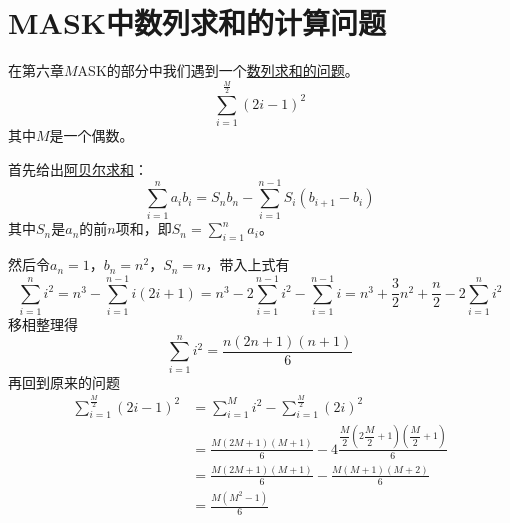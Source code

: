 \section{MASK中数列求和的计算问题}
    在第六章$M$ASK的部分中我们遇到一个\hyperref[question:sum_of_serises]{数列求和的问题}。
    \begin{equation*}
        \sum_{i=1}^{\frac{M}{2}}(2i-1)^2
    \end{equation*}
    其中$M$是一个偶数。

    首先给出\href{https://zh.wikipedia.org/wiki/%E5%88%86%E9%83%A8%E6%B1%82%E5%92%8C%E6%B3%95}{阿贝尔求和}：
    \begin{equation*}
        \sum^{n}_{i=1}a_ib_i=S_nb_n-\sum_{i=1}^{n-1}S_i(b_{i+1}-b_i)
    \end{equation*}
    其中$S_n$是$a_n$的前$n$项和，即$S_n=\displaystyle\sum_{i=1}^{n}a_i$。

    然后令$a_n=1$，$b_n=n^2$，$S_n=n$，带入上式有
    \begin{equation*}
        \sum^{n}_{i=1}i^2=n^3-\sum_{i=1}^{n-1}i(2i+1)=n^3-2\sum_{i=1}^{n-1}i^2-\sum_{i=1}^{n-1}i=n^3+\frac{3}{2}n^2+\frac{n}{2}-2\sum_{i=1}^{n}i^2
    \end{equation*}
    移相整理得
    \begin{equation*}
        \sum^{n}_{i=1}i^2=\frac{n(2n+1)(n+1)}{6} 
    \end{equation*}
    再回到原来的问题
    \begin{equation*}
        \begin{split}
            \sum_{i=1}^{\frac{M}{2}}(2i-1)^2&=\sum_{i=1}^{M}i^2-\sum_{i=1}^{\frac{M}{2}}(2i)^2\\
            &=\frac{M(2M+1)(M+1)}{6}-4\frac{\dfrac{M}{2}\left(2\dfrac{M}{2}+1\right)\left(\dfrac{M}{2}+1\right)}{6}\\
            &=\frac{M(2M+1)(M+1)}{6}-\frac{M(M+1)(M+2)}{6}\\
            &=\frac{M(M^2-1)}{6}
        \end{split}
    \end{equation*}